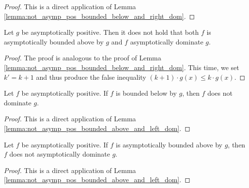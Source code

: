 \begin{proof}
    \leanok
    This is a direct application of Lemma \ref{lemma:not_asymp_pos_bounded_below_and_right_dom}. 
\end{proof}

\begin{lemma}
    \label{lemma:not_asymp_pos_bounded_above_and_left_dom}
    \leanok
    Let $g$ be asymptotically positive. Then it does not hold that both $f$ is asymptotically 
    bounded above by $g$ and $f$ asymptotically dominate $g$.
\end{lemma}

\begin{proof}
    \leanok
    The proof is analogous to the proof of Lemma 
    \ref{lemma:not_asymp_pos_bounded_below_and_right_dom}. This time, we set $k' = k + 1$
    and thus produce the false inequality $(k + 1) \cdot g(x) \le k \cdot g(x)$.
\end{proof}

\begin{theorem}
    \label{thm:not_asymp_left_dom_of_bounded_above_pos}
    \leanok
    Let $f$ be asymptotically positive. If $f$ is bounded below by $g$, then $f$ 
    does not dominate $g$.
\end{theorem}

\begin{proof}
    \leanok
    This is a direct application of Lemma \ref{lemma:not_asymp_pos_bounded_above_and_left_dom}. 
\end{proof}

\begin{theorem}
    \label{thm:not_asymp_bounded_above_of_left_dom_pos}
    \leanok
    Let $f$ be asymptotically positive. If $f$ is asymptotically bounded above by $g$, 
    then $f$ does not asymptotically dominate $g$.
\end{theorem}

\begin{proof}
    \leanok
    This is a direct application of Lemma \ref{lemma:not_asymp_pos_bounded_above_and_left_dom}. 
\end{proof}

